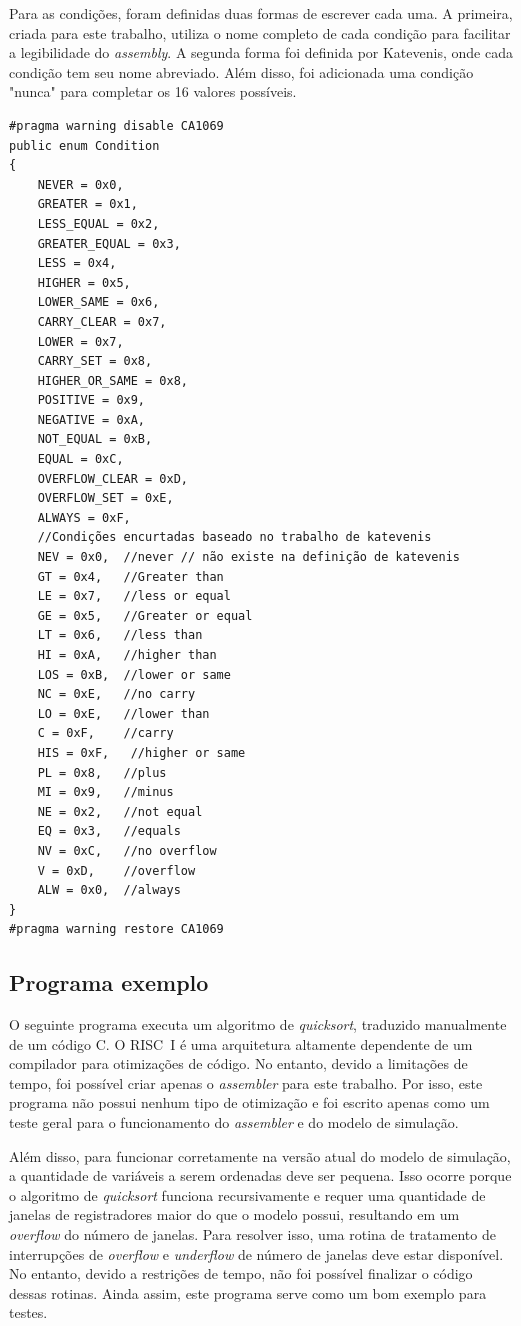 \documentclass[
	article,			%
	11pt,				%
	oneside,			%
	a4paper,			%
	english,			%
	brazil,				%
	sumario=tradicional
	]{abntex2}
\begin{document}
Para as condições, foram definidas duas formas de escrever cada uma. A primeira, criada para este trabalho, utiliza o nome completo de cada condição para facilitar a legibilidade do \textit{assembly}. A segunda forma foi definida por Katevenis, onde cada condição tem seu nome abreviado. Além disso, foi adicionada uma condição "nunca" para completar os 16 valores possíveis.


\begin{lstlisting}
#pragma warning disable CA1069
public enum Condition
{
    NEVER = 0x0,
    GREATER = 0x1,
    LESS_EQUAL = 0x2,
    GREATER_EQUAL = 0x3,
    LESS = 0x4,
    HIGHER = 0x5,
    LOWER_SAME = 0x6,
    CARRY_CLEAR = 0x7,
    LOWER = 0x7,
    CARRY_SET = 0x8,
    HIGHER_OR_SAME = 0x8,
    POSITIVE = 0x9,
    NEGATIVE = 0xA,
    NOT_EQUAL = 0xB,
    EQUAL = 0xC,
    OVERFLOW_CLEAR = 0xD,
    OVERFLOW_SET = 0xE,
    ALWAYS = 0xF,
    //Condições encurtadas baseado no trabalho de katevenis
    NEV = 0x0,  //never // não existe na definição de katevenis
    GT = 0x4,   //Greater than
    LE = 0x7,   //less or equal
    GE = 0x5,   //Greater or equal
    LT = 0x6,   //less than
    HI = 0xA,   //higher than
    LOS = 0xB,  //lower or same
    NC = 0xE,   //no carry
    LO = 0xE,   //lower than
    C = 0xF,    //carry
    HIS = 0xF,   //higher or same
    PL = 0x8,   //plus
    MI = 0x9,   //minus
    NE = 0x2,   //not equal
    EQ = 0x3,   //equals
    NV = 0xC,   //no overflow
    V = 0xD,    //overflow
    ALW = 0x0,  //always
}
#pragma warning restore CA1069
\end{lstlisting}

\subsection{Programa exemplo}

O seguinte programa executa um algoritmo de \textit{quicksort}, traduzido manualmente de um código C. O RISC~I é uma arquitetura altamente dependente de um compilador para otimizações de código. No entanto, devido a limitações de tempo, foi possível criar apenas o \textit{assembler} para este trabalho. Por isso, este programa não possui nenhum tipo de otimização e foi escrito apenas como um teste geral para o funcionamento do \textit{assembler} e do modelo de simulação.

Além disso, para funcionar corretamente na versão atual do modelo de simulação, a quantidade de variáveis a serem ordenadas deve ser pequena. Isso ocorre porque o algoritmo de \textit{quicksort} funciona recursivamente e requer uma quantidade de janelas de registradores maior do que o modelo possui, resultando em um \textit{overflow} do número de janelas. Para resolver isso, uma rotina de tratamento de interrupções de \textit{overflow} e \textit{underflow} de número de janelas deve estar disponível. No entanto, devido a restrições de tempo, não foi possível finalizar o código dessas rotinas. Ainda assim, este programa serve como um bom exemplo para testes.
\end{document}
